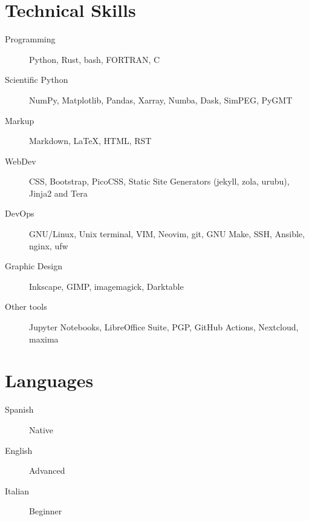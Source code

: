 \documentclass[11pt, letter]{article}
\begin{document}
\section{Technical Skills}

\begin{description}
    \item[Programming] Python, Rust, bash, FORTRAN, C
    \item[Scientific Python] NumPy, Matplotlib, Pandas, Xarray, Numba, Dask,
        SimPEG, PyGMT
    \item[Markup] Markdown, LaTeX, HTML, RST
    \item[WebDev] CSS, Bootstrap, PicoCSS, Static Site Generators (jekyll,
        zola, urubu), Jinja2 and Tera
    \item[DevOps] GNU/Linux, Unix terminal, VIM, Neovim, git, GNU Make, SSH,
        Ansible, nginx, ufw
    \item[Graphic Design] Inkscape, GIMP, imagemagick, Darktable
    \item[Other tools] Jupyter Notebooks, LibreOffice Suite, PGP, GitHub
        Actions, Nextcloud, maxima
\end{description}

\section{Languages}

\begin{description}
    \item[Spanish] Native
    \item[English] Advanced
    \item[Italian] Beginner
\end{description}
\end{document}
